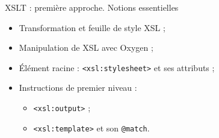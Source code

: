 \documentclass{beamer}
\begin{document}
    \begin{frame}{XSLT : première approche. Notions essentielles}
        \Large
        \begin{itemize}
            \item Transformation et feuille de style XSL ;
            \bigskip
            \item Manipulation de XSL avec Oxygen ;
            \bigskip
            \item Élément racine : \texttt{<xsl:stylesheet>} et ses attributs ;
            \bigskip
            \item Instructions de premier niveau :
            \begin{itemize}
            \Large
                \item \texttt{<xsl:output>} ;
                \item \texttt{<xsl:template>} et son \texttt{@match}.
            \end{itemize}
        \end{itemize}
    \end{frame}
\end{document}
